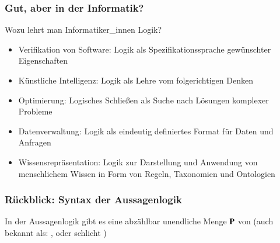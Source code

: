 \documentclass[onlymath]{beamer}
\begin{document}
\begin{frame}\frametitle{Gut, aber in der Informatik?}

Wozu lehrt man Informatiker\_innen Logik?
\begin{itemize}
\item \alert{Verifikation von Software:} Logik als Spezifikationssprache gewünschter Eigenschaften
\item \alert{Künstliche Intelligenz:} Logik als Lehre vom folgerichtigen Denken
\item \alert{Optimierung:} Logisches Schließen als Suche nach Lösungen komplexer Probleme
\item \alert{Datenverwaltung:} Logik als eindeutig definiertes Format für Daten und Anfragen
\item \alert{Wissensrepräsentation:} Logik zur Darstellung und Anwendung von menschlichem Wissen in Form von Regeln, Taxonomien und Ontologien
\end{itemize}

\end{frame}

\begin{frame}\frametitle{Rückblick: Syntax der Aussagenlogik}

In der Aussagenlogik gibt es eine abzählbar unendliche Menge $\textbf{\textcolor{black}{P}}$ von
 (auch bekannt als: ,  oder schlicht )
\medskip


\end{frame}
\end{document}
